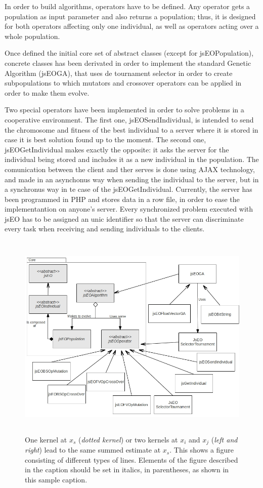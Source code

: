 \documentclass{llncs}
\begin{document}
In order to build algorithms, operators have to be defined. Any operator gets a population as input parameter and also returns a population; thus, it is designed for both operators affecting only one individual, as well as operators acting over a whole population.

Once defined the initial core set of abstract classes (except for jsEOPopulation), concrete classes has been derivated in order to implement the standard Genetic Algorithm (jsEOGA), that uses de tournament selector in order to create subpopulations to which mutators and crossover operators can be applied in order to make them evolve.

Two special operators have been implemented in order to solve problems in a cooperative environment. The first one, jsEOSendIndividual, is intended to send the chromosome and fitness of the best individual to a server where it is stored in case it is best solution found up to the moment. The second one, jsEOGetIndividual makes exactly the opposite: it asks the server for the individual being stored and includes it as a new individual in the population. The comunication between the client and ther serves is done using AJAX technology, and made in an asynchonus way when sending the individual to the server, but in a synchronus way in te case of the jsEOGetIndividual. Currently, the server has been programmed in PHP and stores data in a row file, in order to ease the implementantion on anyone's server. Every synchronized problem executed with jsEO has to be assigned an unic identifier so that the server can discriminate every task when receiving and sending individuals to the clients.

\begin{figure}
\centering
\includegraphics[height=10cm]{class-diagram.jpg}
\caption{One kernel at $x_s$ (\emph{dotted kernel}) or two kernels at
$x_i$ and $x_j$ (\textit{left and right}) lead to the same summed estimate
at $x_s$. This shows a figure consisting of different types of
lines. Elements of the figure described in the caption should be set in
italics, in parentheses, as shown in this sample caption.}
\label{fig:example}
\end{figure}
\end{document}
